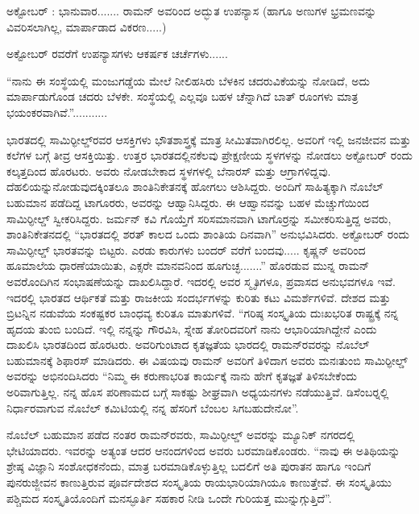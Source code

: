 ಅಕ್ಟೋಬರ್ : ಭಾನುವಾರ....... ರಾಮನ್ ಅವರಿಂದ ಅದ್ಭುತ ಉಪನ್ಯಾಸ (ಹಾಗೂ ಅಣುಗಳ ಭ್ರಮಣವನ್ನು ವಿವರಿಸಲಾಗಿಲ್ಲ, ಮಾರ್ಪಾಡಾದ ವಿಕರಣ.....) 

\vskip 1pt

ಅಕ್ಟೋಬರ್  ರವರೆಗೆ ಉಪನ್ಯಾಸಗಳು ಆಕರ್ಷಕ ಚರ್ಚೆಗಳು...... 

\vskip 1pt

“ನಾನು ಈ ಸಂಸ್ಥೆಯಲ್ಲಿ ಮಂಜುಗಡ್ಡೆಯ ಮೇಲೆ ನೀಲಿ\enginline{-}ಹಸಿರು ಬೆಳಕಿನ ಚದರುವಿಕೆಯನ್ನು ನೋಡಿದೆ, ಅದು ಮಾರ್ಪಾಡುಗೊಂಡ ಚದರು ಬೆಳಕೇ. ಸಂಸ್ಥೆಯಲ್ಲಿ ಎಲ್ಲವೂ ಬಹಳ ಚೆನ್ನಾಗಿದೆ ಬಾತ್ ರೂಂಗಳು ಮಾತ್ರ ಭಯಂಕರವಾಗಿವೆ.”...........

\vskip 1pt

ಭಾರತದಲ್ಲಿ ಸಾಮಿರ್‍ಫೀಲ್ಡ್‌ರವರ ಆಸಕ್ತಿಗಳು ಭೌತಶಾಸ್ತ್ರಕ್ಕೆ ಮಾತ್ರ ಸೀಮಿತವಾಗಿರಲಿಲ್ಲ. ಅವರಿಗೆ ಇಲ್ಲಿ ಜನಜೀವನ ಮತ್ತು ಕಲೆಗಳ ಬಗ್ಗೆ ತೀವ್ರ ಆಸಕ್ತಿಯಿತ್ತು. ಉತ್ತರ ಭಾರತದಲ್ಲಿನ\break ಕೆಲವು ಪ್ರೇಕ್ಷಣೀಯ ಸ್ಥಳಗಳನ್ನು ನೋಡಲು  ಅಕ್ಟೋಬರ್ ರಂದು ಕಲ್ಕತ್ತದಿಂದ ಹೊರಟರು. ಅವರು ನೋಡಬೇಕಾದ ಸ್ಥಳಗಳಲ್ಲಿ ಬೆನಾರಸ್ ಮತ್ತು ಆಗ್ರಾಗಳಿದ್ದವು. ದೆಹಲಿಯನ್ನು\break ನೋಡುವುದಕ್ಕಿಂತಲೂ ಶಾಂತಿನಿಕೇತನಕ್ಕೆ ಹೋಗಲು ಆಶಿಸಿದ್ದರು. ಅಂದಿಗೆ ಸಾಹಿತ್ಯಕ್ಕಾಗಿ ನೊಬೆಲ್ ಬಹುಮಾನ ಪಡೆದಿದ್ದ ಟಾಗೂರರು, ಅವರನ್ನು ಆಹ್ವಾನಿಸಿದ್ದರು. ಈ ಆಹ್ವಾನವನ್ನು ಬಹಳ ಮೆಚ್ಚುಗೆಯಿಂದ ಸಾಮಿರ್‍ಫೀಲ್ಡ್ ಸ್ವೀಕರಿಸಿದ್ದರು. ಜರ್ಮನ್ ಕವಿ ಗೊಯ್ತೆಗೆ ಸರಿಸಮಾನವಾಗಿ ಟಾಗೊರ್‍ರನ್ನು ಸಮೀಕರಿಸುತ್ತಿದ್ದ ಅವರು, ಶಾಂತಿನಿಕೇತನದಲ್ಲಿ “ಭಾರತದಲ್ಲಿ ಶರತ್ ಕಾಲದ ಒಂದು ಶಾಂತಿಯ ದಿನವಾಗಿ” ಅನುಭವಿಸಿದರು. ಅಕ್ಟೋಬರ್  ರಂದು ಸಾಮಿರ್‍ಫೀಲ್ಡ್ ಭಾರತವನ್ನು ಬಿಟ್ಟರು. ಎರಡು ಕಾರುಗಳು ಬಂದರ್ ವರೆಗೆ ಬಂದವು..... ಕೃಷ್ಣನ್ ಅವರಿಂದ ಹೂಮಾಲೆಯ ಧಾರಣೆಯಾಯಿತು, ಎಕ್ಸರೇ ಮಾನವನಿಂದ ಹೂಗುಚ್ಛ.......” ಹೊರಡುವ ಮುನ್ನ ರಾಮನ್ ಅವರೊಂದಿಗಿನ ಸಂಭಾಷಣೆಯನ್ನು ದಾಖಲಿಸಿದ್ದಾರೆ. ಇದರಲ್ಲಿ ಅವರ ಸ್ಮೃತಿಗಳೂ, ಪ್ರವಾಸದ ಅನುಭವಗಳೂ ಇವೆ. ಇದರಲ್ಲಿ ಭಾರತದ ಆರ್ಥಿಕತೆ ಮತ್ತು ರಾಜಕೀಯ ಸಂದರ್ಭಗಳನ್ನು ಕುರಿತು ಕಟು ವಿಮರ್ಶೆಗಳಿವೆ. ದೇಶದ ಮತ್ತು ಬ್ರಿಟನ್ನಿನ ನಡುವೆಯ ಸಂಕಷ್ಟಕರ ಬಾಂಧವ್ಯ ಕುರಿತೂ ಮಾತುಗಳಿವೆ. “ಗರಿಷ್ಠ ಸಂಸ್ಕೃತಿಯ ದುಃಖಭರಿತ ರಾಷ್ಟ್ರಕ್ಕೆ ನನ್ನ ಹೃದಯ ತುಂಬಿ ಬಂದಿದೆ. ಇಲ್ಲಿ ನನ್ನನ್ನು ಗೌರವಿಸಿ, ಸ್ನೇಹ ತೋರಿದವರಿಗೆ ನಾನು ಆಭಾರಿಯಾಗಿದ್ದೇನೆ ಎಂದು ದಾಖಲಿಸಿ ಭಾರತದಿಂದ ಹೊರಟರು. ಅವರಿಗುಂಟಾದ ಕೃತಜ್ಞತೆಯ ಭಾರದಲ್ಲಿ ರಾಮನ್‍ರವರನ್ನು ನೊಬೆಲ್ ಬಹುಮಾನಕ್ಕೆ ಶಿಫಾರಸ್ ಮಾಡಿದರು. ಈ ವಿಷಯವು ರಾಮನ್ ಅವರಿಗೆ ತಿಳಿದಾಗ ಅವರು ಮನಃತುಂಬಿ ಸಾಮಿರ್‍ಫೀಲ್ಡ್ ಅವರನ್ನು ಅಭಿನಂದಿಸಿದರು\enginline{-} “ನಿಮ್ಮ ಈ ಕರುಣಾಭರಿತ ಕಾರ್ಯಕ್ಕೆ ನಾನು ಹೇಗೆ ಕೃತಜ್ಞತೆ ತಿಳಿಸಬೇಕೆಂದು ಅರಿವಾಗುತ್ತಿಲ್ಲ. ನನ್ನ ಹೊಸ ಪರಿಣಾಮದ ಬಗ್ಗೆ ಸಾಕಷ್ಟು ಶೀಘ್ರವಾಗಿ ಅಧ್ಯಯನಗಳು ನಡೆಯುತ್ತಿವೆ. ಡಿಸೆಂಬರ್‍ನಲ್ಲಿ ನಿರ್ಧಾರವಾಗುವ ನೊಬೆಲ್ ಕಮಿಟಿಯಲ್ಲಿ ನನ್ನ ಹೆಸರಿಗೆ ಬೆಂಬಲ ಸಿಗಬಹುದೇನೋ”.

\vskip 1pt

ನೊಬೆಲ್ ಬಹುಮಾನ ಪಡೆದ ನಂತರ ರಾಮನ್‍ರವರು, ಸಾಮಿರ್‍ಫೀಲ್ಡ್ ಅವರನ್ನು ಮ್ಯೂನಿಕ್ ನಗರದಲ್ಲಿ ಭೇಟಿಯಾದರು. ಇವರನ್ನು ಅತ್ಯಂತ ಆದರ ಆನಂದಗಳಿಂದ ಅವರು ಬರಮಾಡಿಕೊಂಡರು. “ನಾವು ಈ ಅತಿಥಿಯನ್ನು ಶ್ರೇಷ್ಠ ವಿಜ್ಞಾನಿ ಸಂಶೋಧಕನೆಂದು, ಮಾತ್ರ ಬರಮಾಡಿಕೊಳ್ಳುತ್ತಿಲ್ಲ ಬದಲಿಗೆ ಅತಿ ಪುರಾತನ ಹಾಗೂ ಇಂದಿಗೆ ಪುನರುಜ್ಜೀವನ ಕಾಣುತ್ತಿರುವ ಪೂರ್ವದೇಶದ ಸಂಸ್ಕೃತಿಯ ರಾಯಭಾರಿಯಾಗಿಯೂ ಕಾಣುತ್ತೇವೆ. ಈ ಸಂಸ್ಕೃತಿಯು ಪಶ್ಚಿಮದ ಸಂಸ್ಕೃತಿಯೊಂದಿಗೆ ಮನಸ್ಫೂರ್ತಿ ಸಹಕಾರ ನೀಡಿ ಒಂದೇ ಗುರಿಯತ್ತ ಮುನ್ನುಗ್ಗುತ್ತಿದೆ”.

